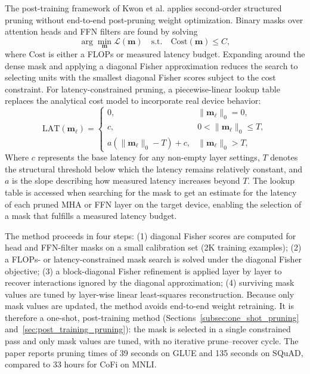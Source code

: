 The post-training framework of Kwon et al. \cite{kwon2022fast} applies second-order structured pruning without end-to-end post-pruning weight optimization. Binary masks over attention heads and FFN filters are found by solving
\begin{equation}
	\arg\min_{\mathbf{m}} \mathcal{L}(\mathbf{m})
	\quad \text{s.t.} \quad
	\mathrm{Cost}(\mathbf{m}) \leq C,
\end{equation}
where $\mathrm{Cost}$ is either a FLOPs or measured latency budget. Expanding around the dense mask and applying a diagonal Fisher approximation reduces the search to selecting units with the smallest diagonal Fisher scores subject to the cost constraint. For latency-constrained pruning, a piecewise-linear lookup table replaces the analytical cost model to incorporate real device behavior:
\begin{equation}
	\mathrm{LAT}(\mathbf{m}_{\ell}) =
	\begin{cases}
		0, & \|\mathbf{m}_{\ell}\|_0 = 0, \\
		c, & 0 < \|\mathbf{m}_{\ell}\|_0 \leq T, \\
		a(\|\mathbf{m}_{\ell}\|_0 - T) + c, & \|\mathbf{m}_{\ell}\|_0 > T,
	\end{cases}
\end{equation}
Where $c$ represents the base latency for any non-empty layer settings, $T$ denotes the structural threshold below which the latency remains relatively constant, and $a$ is the slope describing how measured latency increases beyond $T$. The lookup table is accessed when searching for the mask to get an estimate for the latency of each pruned MHA or FFN layer on the target device, enabling the selection of a mask that fulfills a measured latency budget.

The method proceeds in four steps: (1) diagonal Fisher scores are computed for head and FFN-filter masks on a small calibration set (2K training examples); (2) a FLOPs- or latency-constrained mask search is solved under the diagonal Fisher objective; (3) a block-diagonal Fisher refinement is applied layer by layer to recover interactions ignored by the diagonal approximation; (4) surviving mask values are tuned by layer-wise linear least-squares reconstruction. Because only mask values are updated, the method avoids end-to-end weight retraining. It is therefore a one-shot, post-training method (Sections~\ref{subsec:one_shot_pruning} and~\ref{sec:post_training_pruning}): the mask is selected in a single constrained pass and only mask values are tuned, with no iterative prune--recover cycle. The paper reports pruning times of 39 seconds on GLUE and 135 seconds on SQuAD, compared to 33 hours for CoFi on MNLI.

